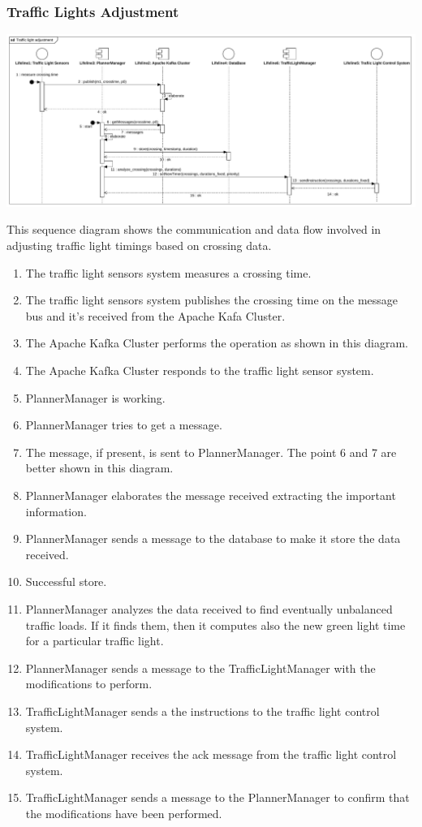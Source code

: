 \documentclass[12pt, a4paper, twoside, openright]{report}
\begin{document}
\subsubsection{Traffic Lights Adjustment}

\includegraphics[width=\linewidth]{images/svg/traffic_light_adjustment.pdf}

This sequence diagram shows the communication and data flow involved in
adjusting traffic light timings based on crossing data.

\begin{enumerate}
\item
  The traffic light sensors system measures a crossing time.
\item
  The traffic light sensors system publishes the crossing time on the
  message bus and it's received from the Apache Kafa Cluster.
\item
  The Apache Kafka Cluster performs the operation as shown in this
  diagram.
\item
  The Apache Kafka Cluster responds to the traffic light sensor system.
\item
  PlannerManager is working.
\item
  PlannerManager tries to get a message.
\item
  The message, if present, is sent to PlannerManager. The point 6
  and 7 are better shown in this diagram.
\item
  PlannerManager elaborates the message received extracting the
  important information.
\item
  PlannerManager sends a message to the database to make it store
  the data received.
\item
  Successful store.
\item
  PlannerManager analyzes the data received to find eventually
  unbalanced traffic loads. If it finds them, then it computes also the
  new green light time for a particular traffic light.
\item
  PlannerManager sends a message to the TrafficLightManager with the modifications to perform.
\item
  TrafficLightManager sends a the instructions to the traffic light control system.
\item 
  TrafficLightManager receives the ack message from the traffic light
  control system.
\item
  TrafficLightManager sends a message to the PlannerManager to
  confirm that the modifications have been performed.
\end{enumerate}
\end{document}
